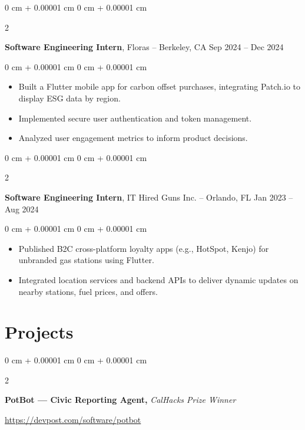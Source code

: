 \documentclass[10pt, letterpaper]{article}
\newenvironment{highlights}{
    \begin{itemize}[
        topsep=0.3 cm,
        parsep=0.05 cm,
        partopsep=0pt,
        itemsep=0.02 cm,
        leftmargin=0 cm + 10pt
    ]
}{
    \end{itemize}
} %
\newenvironment{onecolentry}{
    \begin{adjustwidth}{
        0 cm + 0.00001 cm
    }{
        0 cm + 0.00001 cm
    }
}{
    \end{adjustwidth}
} %
\newenvironment{twocolentry}[2][]{
    \onecolentry
    \def\secondColumn{#2}
    \setcolumnwidth{\fill, 4.5 cm}
    \begin{paracol}{2}
}{
    \switchcolumn \raggedleft \secondColumn
    \end{paracol}
    \endonecolentry
} %
\newenvironment{extendedtwocolentry}[2][]{
    \onecolentry
    \def\secondColumn{#2}
    \setcolumnwidth{\fill, 8 cm}
    \begin{paracol}{2}
}{
    \switchcolumn \raggedleft \secondColumn
    \end{paracol}
    \endonecolentry
}
\begin{document}
        \vspace{0.10 cm}

        \begin{twocolentry}{
            Sep 2024 – Dec 2024
        }
            \textbf{Software Engineering Intern}, Floras -- Berkeley, CA\end{twocolentry}

        \vspace{0.10 cm}
        \begin{onecolentry}
            \begin{highlights}
                \item Built a Flutter mobile app for carbon offset purchases, integrating Patch.io to display ESG data by region.
                \item Implemented secure user authentication and token management.
                \item Analyzed user engagement metrics to inform product decisions.
            \end{highlights}
        \end{onecolentry}

        \vspace{0.10 cm}

        \begin{twocolentry}{
            Jan 2023 – Aug 2024
        }
            \textbf{Software Engineering Intern}, IT Hired Guns Inc. -- Orlando, FL\end{twocolentry}

        \vspace{0.10 cm}
        \begin{onecolentry}
            \begin{highlights}
                \item Published B2C cross-platform loyalty apps (e.g., HotSpot, Kenjo) for unbranded gas stations using Flutter.
                \item Integrated location services and backend APIs to deliver dynamic updates on nearby stations, fuel prices, and offers.
            \end{highlights}
        \end{onecolentry}

    \section{Projects}

        \begin{extendedtwocolentry}{
            \href{https://devpost.com/software/potbot}{https://devpost.com/software/potbot}
        }
            \textbf{PotBot — Civic Reporting Agent,} \textit{CalHacks Prize Winner}
        \end{extendedtwocolentry}
\end{document}
